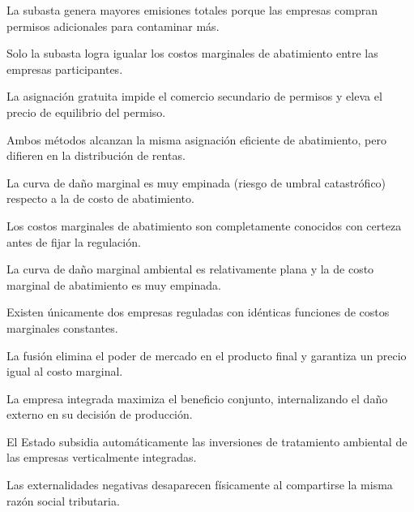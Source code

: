 \begin{opts}
    \item La subasta genera mayores emisiones totales porque las empresas compran permisos adicionales para contaminar más.
    \item Solo la subasta logra igualar los costos marginales de abatimiento entre las empresas participantes.
    \item La asignación gratuita impide el comercio secundario de permisos y eleva el precio de equilibrio del permiso.
    \item Ambos métodos alcanzan la misma asignación eficiente de abatimiento, pero difieren en la distribución de rentas.
\end{opts}

\begin{opts}
    \item La curva de daño marginal es muy empinada (riesgo de umbral catastrófico) respecto a la de costo de abatimiento.
    \item Los costos marginales de abatimiento son completamente conocidos con certeza antes de fijar la regulación.
    \item La curva de daño marginal ambiental es relativamente plana y la de costo marginal de abatimiento es muy empinada.
    \item Existen únicamente dos empresas reguladas con idénticas funciones de costos marginales constantes.
\end{opts}

\begin{opts}
    \item La fusión elimina el poder de mercado en el producto final y garantiza un precio igual al costo marginal.
    \item La empresa integrada maximiza el beneficio conjunto, internalizando el daño externo en su decisión de producción.
    \item El Estado subsidia automáticamente las inversiones de tratamiento ambiental de las empresas verticalmente integradas.
    \item Las externalidades negativas desaparecen físicamente al compartirse la misma razón social tributaria.
\end{opts}

